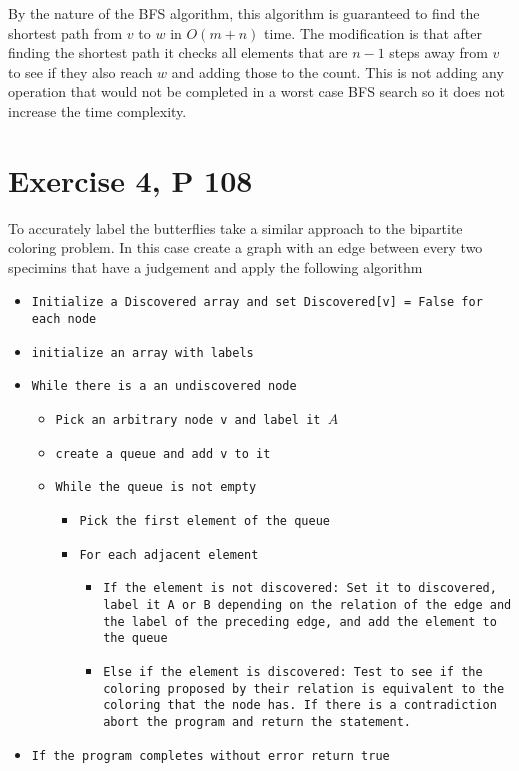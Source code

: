 \documentclass{amsart}
\begin{document}
By the nature of the BFS algorithm, this algorithm is guaranteed to find the shortest path from $v$ to $w$ 
in $O(m+n)$ time. The modification is that after finding the shortest path it checks all elements that are $n-1$ 
steps away from $v$ to see if they also reach $w$ and adding those to the count. This is not adding
any operation that would not be completed in a worst case BFS search so it does not increase the time complexity. 
\section{Exercise 4, P 108}
To accurately label the butterflies take a similar approach to the bipartite coloring problem. In this case
create a graph with an edge between every two specimins that have a judgement and apply the following algorithm
{\small %
\begin{itemize} 
    \item \texttt{Initialize a Discovered array and set Discovered[v] = False for each node}
    \item \texttt{initialize an array with labels}
    \item \texttt{While there is a an undiscovered node}
        \begin{itemize}
            \item \texttt{Pick an arbitrary node v and label it $A$ }
            \item \texttt{create a queue and add v to it}
            \item \texttt{While the queue is not empty}
                \begin{itemize}
                    \item \texttt{Pick the first element of the queue}
                    \item \texttt{For each adjacent element }
                        \begin{itemize}
                            \item \texttt{If the element is not discovered: Set it
                                to discovered, label it A or B depending on the relation of the edge
                            and the label of the preceding edge, and add the element to the queue}
                        \item \texttt{Else if the element is discovered: Test to see if the coloring proposed by their relation
                                is equivalent to the coloring that the node has. If there is a contradiction abort the program and
                            return the statement.}
                        \end{itemize}
                \end{itemize}
        \end{itemize}
    \item \texttt{If the program completes without error return true}
\end{itemize} 
}
\end{document}
